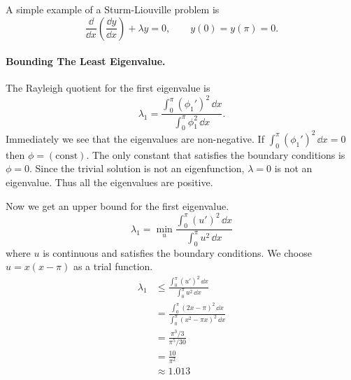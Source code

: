 \begin{Example}
  A simple example of a Sturm-Liouville problem is
  \[ 
  \frac{\dd}{\dd x}\left(\frac{\dd y}{\dd x}\right) + \lambda y = 0, \qquad
  y(0) = y(\pi) = 0.
  \]

  \paragraph{Bounding The Least Eigenvalue.}
  The Rayleigh quotient for the first eigenvalue is
  \[ 
  \lambda_1 = \frac{\int_0^\pi (\phi_1')^2 \,\dd x}{\int_0^\pi \phi_1^2 \,\dd x}. 
  \]
  Immediately we see that the eigenvalues are non-negative.  If 
  $\int_0^\pi (\phi_1')^2\,\dd x = 0$ then $\phi = (\mathrm{const})$.  
  The only constant that 
  satisfies the boundary conditions is $\phi = 0$.  
  Since the trivial solution is not an
  eigenfunction, $\lambda = 0$ is not an eigenvalue.  
  Thus all the eigenvalues are positive.

  Now we get an upper bound for the first eigenvalue.
  \[ 
  \lambda_1 = \min_u \frac{\int_0^\pi (u')^2 \,\dd x}{\int_0^\pi u^2\,\dd x} 
  \]
  where $u$ is continuous and satisfies the boundary conditions.  We choose
  $u = x (x - \pi)$ as a trial function.
  \begin{align*}
    \lambda_1
    &\leq \frac{\int_0^\pi (u')^2 \,\dd x}{\int_0^\pi u^2\,\dd x} 
    \\
    &= \frac{\int_0^\pi (2x-\pi)^2 \,\dd x}{\int_0^\pi (x^2-\pi x)^2 \,\dd x} 
    \\
    &= \frac{\pi^3 /3}{\pi^5 / 30} 
    \\
    &= \frac{10}{\pi^2} 
    \\
    &\approx 1.013
  \end{align*}


\end{Example}
